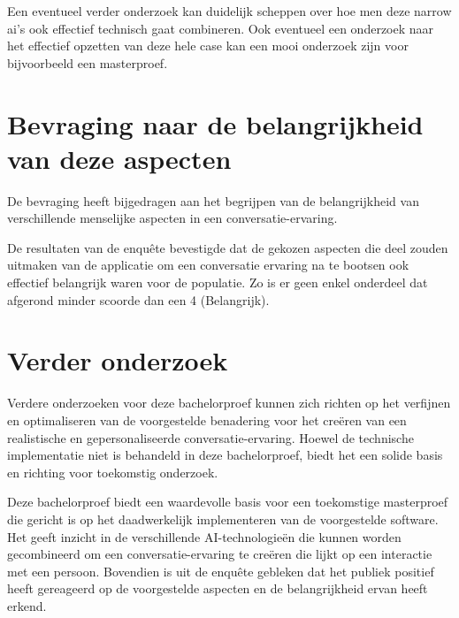 Een eventueel verder onderzoek kan duidelijk scheppen over hoe men deze narrow ai's ook effectief technisch gaat combineren. Ook eventueel een onderzoek naar het effectief opzetten van deze hele case kan een mooi onderzoek zijn voor bijvoorbeeld een masterproef.

\section{Bevraging naar de belangrijkheid van deze aspecten}

De bevraging heeft bijgedragen aan het begrijpen van de belangrijkheid van verschillende menselijke aspecten in een conversatie-ervaring. 

De resultaten van de enquête bevestigde dat de gekozen aspecten die deel zouden uitmaken van de applicatie om een conversatie ervaring na te bootsen ook effectief belangrijk waren voor de populatie. Zo is er geen enkel onderdeel dat afgerond minder scoorde dan een 4 (Belangrijk).

\section{Verder onderzoek}

Verdere onderzoeken voor deze bachelorproef kunnen zich richten op het verfijnen en optimaliseren van de voorgestelde benadering voor het creëren van een realistische en gepersonaliseerde conversatie-ervaring. Hoewel de technische implementatie niet is behandeld in deze bachelorproef, biedt het een solide basis en richting voor toekomstig onderzoek.

Deze bachelorproef biedt een waardevolle basis voor een toekomstige masterproef die gericht is op het daadwerkelijk implementeren van de voorgestelde software. Het geeft inzicht in de verschillende AI-technologieën die kunnen worden gecombineerd om een conversatie-ervaring te creëren die lijkt op een interactie met een persoon. Bovendien is uit de enquête gebleken dat het publiek positief heeft gereageerd op de voorgestelde aspecten en de belangrijkheid ervan heeft erkend.



